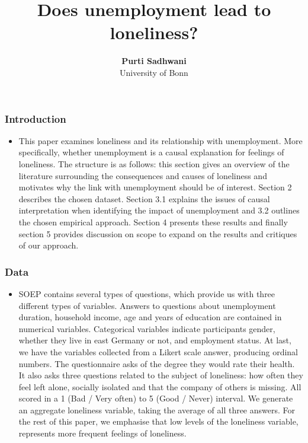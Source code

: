 \documentclass[11pt, aspectratio=169]{beamer}
\begin{document}
\title{Does unemployment lead to loneliness?}

\author[Purti Sadhwani]
{
{\bf Purti Sadhwani}\\
{\small University of Bonn}\\[1ex]
}


\begin{frame}[t]
    \frametitle{Introduction}
    \begin{itemize}
    \item This paper examines loneliness and its relationship with unemployment. More specifically,
    whether unemployment is a causal explanation for feelings of loneliness. The structure is as
    follows: this section gives an overview of the literature surrounding the consequences and
    causes of loneliness and motivates why the link with unemployment should be of interest.
    Section 2 describes the chosen dataset. Section 3.1 explains the issues of causal interpretation when identifying the impact of unemployment and 3.2 outlines the chosen empirical
    approach. Section 4 presents these results and finally section 5 provides discussion on scope
    to expand on the results and critiques of our approach.
    \end{itemize}
    \note{~}
\end{frame}

\begin{frame}[t]
    \frametitle{Data}
     \begin{itemize}
           \item SOEP contains several types of questions, which provide us with three different types
            of variables. Answers to questions about unemployment duration, household income, age
            and years of education are contained in numerical variables. Categorical variables indicate
            participants gender, whether they live in east Germany or not, and employment status. At
            last, we have the variables collected from a Likert scale answer, producing ordinal numbers. The questionnaire asks of the degree they would rate their health. It also asks three
            questions related to the subject of loneliness: how often they feel left alone, socially isolated
            and that the company of others is missing. All scored in a 1 (Bad / Very often) to 5 (Good
            / Never) interval. We generate an aggregate loneliness variable, taking the average of all
            three answers. For the rest of this paper, we emphasise that low levels of the loneliness
            variable, represents more frequent feelings of loneliness.
     \end{itemize}
    \note{~}
\end{frame}
\end{document}
